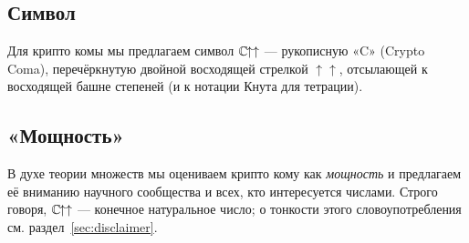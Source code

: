 \subsection{Символ}
Для крипто комы мы предлагаем символ \(\mathbb{C}\mkern-1.5mu{\uparrow\uparrow}\) --- рукописную «C» (Crypto Coma),
перечёркнутую двойной восходящей стрелкой \(\uparrow\uparrow\), отсылающей к восходящей
башне степеней (и к нотации Кнута для тетрации).

\subsection{«Мощность»}
В духе теории множеств мы оцениваем крипто кому как \emph{мощность} и предлагаем её
вниманию научного сообщества и всех, кто интересуется числами. Строго говоря, \(\mathbb{C}\mkern-1.5mu{\uparrow\uparrow}\)
--- конечное натуральное число; о тонкости этого словоупотребления см.
раздел~\ref{sec:disclaimer}.
